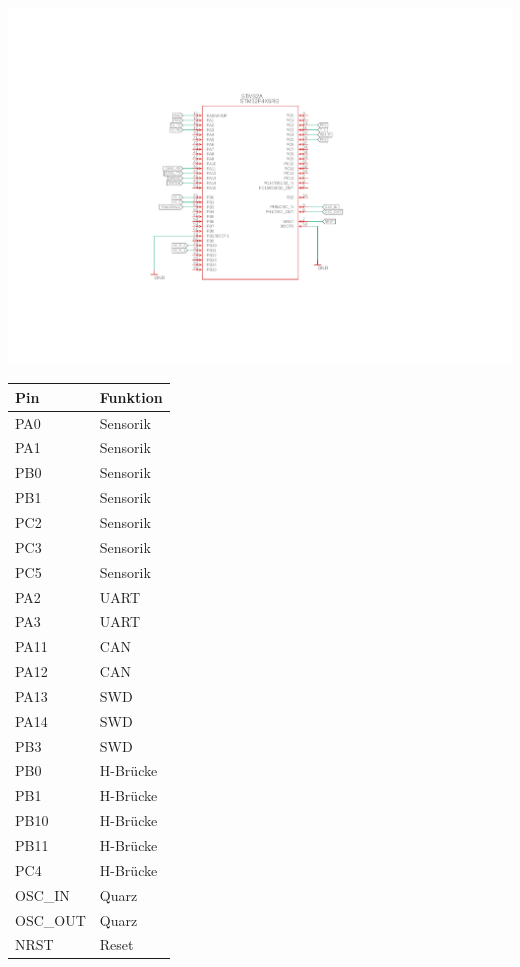 \noindent\begin{minipage}{0.75\textwidth}
\includegraphics[width=\textwidth]{./Bilder/MCU_PINS.pdf}
\end{minipage}
\noindent\begin{minipage}{0.1\textwidth}
\begin{tabular}{l | l}
			Pin & Funktion\\ \hline
			PA0& Sensorik\\
			PA1& Sensorik\\
			PB0& Sensorik\\
			PB1& Sensorik\\
			PC2& Sensorik\\
			PC3& Sensorik\\
			PC5& Sensorik\\
			PA2& UART\\
			PA3& UART\\
			PA11& CAN\\
			PA12& CAN\\
			PA13&SWD\\
			PA14&SWD\\
			PB3& SWD\\
			PB0 & H-Brücke\\
			PB1 &H-Brücke\\
			PB10&H-Brücke\\
			PB11&H-Brücke\\
			PC4&H-Brücke\\
			OSC\_IN&Quarz\\
			OSC\_OUT&Quarz\\
			NRST & Reset
		\end{tabular}
\end{minipage}

